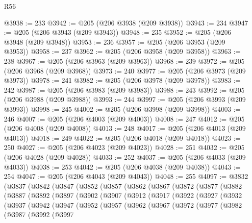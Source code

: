 \begin{lexlean}{R56}
\begin{coremodule}
{{{{{{{{{{{{{{{{{{{{{{{{{{{{{{{{{{{{{{{{{{{{{{{{{{{{{{{{{{{{{{{{{{{{{{{{{{{{{{{{{{{{{{{{{{{{{{{{{{{{{{{{{{{{{{{{{{{{{{{{{{{{{{{{{{{{{{{{{{{{{{{{{{{{{{{{{{{{{{{{{{{{{{{{{{{{{{{{{{{{{{{{{{{{{{{{{{{{{{{{{{{{{{{{{{{@3938 := 233
@3942 := @205 (@206 @3938 (@209 @3938))
@3943 := 234
@3947 := @205 (@206 @3943 (@209 @3943))
@3948 := 235
@3952 := @205 (@206 @3948 (@209 @3948))
@3953 := 236
@3957 := @205 (@206 @3953 (@209 @3953))
@3958 := 237
@3962 := @205 (@206 @3958 (@209 @3958))
@3963 := 238
@3967 := @205 (@206 @3963 (@209 @3963))
@3968 := 239
@3972 := @205 (@206 @3968 (@209 @3968))
@3973 := 240
@3977 := @205 (@206 @3973 (@209 @3973))
@3978 := 241
@3982 := @205 (@206 @3978 (@209 @3978))
@3983 := 242
@3987 := @205 (@206 @3983 (@209 @3983))
@3988 := 243
@3992 := @205 (@206 @3988 (@209 @3988))
@3993 := 244
@3997 := @205 (@206 @3993 (@209 @3993))
@3998 := 245
@4002 := @205 (@206 @3998 (@209 @3998))
@4003 := 246
@4007 := @205 (@206 @4003 (@209 @4003))
@4008 := 247
@4012 := @205 (@206 @4008 (@209 @4008))
@4013 := 248
@4017 := @205 (@206 @4013 (@209 @4013))
@4018 := 249
@4022 := @205 (@206 @4018 (@209 @4018))
@4023 := 250
@4027 := @205 (@206 @4023 (@209 @4023))
@4028 := 251
@4032 := @205 (@206 @4028 (@209 @4028))
@4033 := 252
@4037 := @205 (@206 @4033 (@209 @4033))
@4038 := 253
@4042 := @205 (@206 @4038 (@209 @4038))
@4043 := 254
@4047 := @205 (@206 @4043 (@209 @4043))
@4048 := 255
@4097 := @3832
    (@3837
      (@3842
        (@3847
          (@3852
            (@3857
              (@3862
                (@3867
                  (@3872
                    (@3877
                      (@3882
                        (@3887
                          (@3892
                            (@3897
                              (@3902
                                (@3907
                                  (@3912
                                    (@3917
                                      (@3922
                                        (@3927
                                          (@3932
                                            (@3937
                                              (@3942
                                                (@3947
                                                  (@3952
                                                    (@3957
                                                      (@3962
                                                        (@3967
                                                          (@3972
                                                            (@3977
                                                              (@3982
                                                                (@3987
                                                                  (@3992
                                                                    (@3997
}}}}}}}}}}}}}}}}}}}}}}}}}}}}}}}}}}}}}}}}}}}}}}}}}}}}}}}}}}}}}}}}}}}}}}}}}}}}}}}}}}}}}}}}}}}}}}}}}}}}}}}}}}}}}}}}}}}}}}}}}}}}}}}}}}}}}}}}}}}}}}}}}}}}}}}}}}}}}}}}}}}}}}}}}}}}}}}}}}}}}}}}}}}}}}}}}}}}}}}}}}}}}}}}}}}
\end{coremodule}
\end{lexlean}
